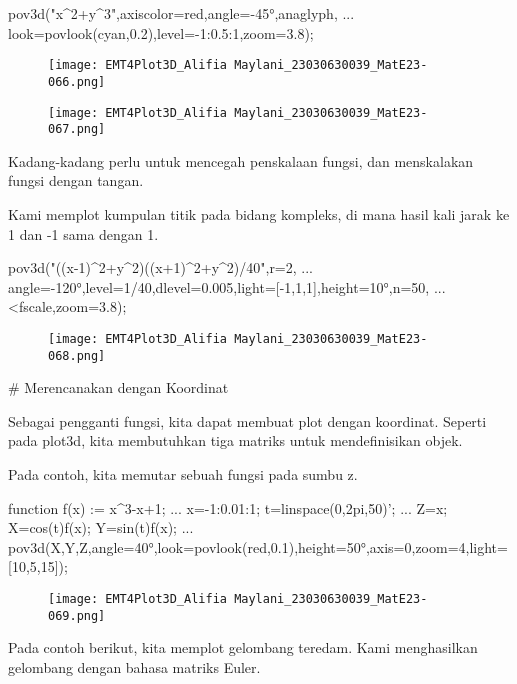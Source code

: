 \documentclass{article}
\begin{document}
\>pov3d("x^2+y^3",axiscolor=red,angle=-45°,\>anaglyph, ...  
\>     look=povlook(cyan,0.2),level=-1:0.5:1,zoom=3.8);




\begin{figure}
    \centering
    \texttt{[image: EMT4Plot3D\_Alifia Maylani\_23030630039\_MatE23-066.png]}
    \caption{}
    \label{fig:enter-label}
\end{figure}

\begin{figure}
    \centering
    \texttt{[image: EMT4Plot3D\_Alifia Maylani\_23030630039\_MatE23-067.png]}
    \caption{}
    \label{fig:enter-label}
\end{figure}

Kadang-kadang perlu untuk mencegah penskalaan fungsi, dan menskalakan
fungsi dengan tangan.


Kami memplot kumpulan titik pada bidang kompleks, di mana hasil kali
jarak ke 1 dan -1 sama dengan 1.


\>pov3d("((x-1)^2+y^2)\*((x+1)^2+y^2)/40",r=2, ...  
\>     angle=-120°,level=1/40,dlevel=0.005,light=[-1,1,1],height=10°,n=50, ...  
\>     <fscale,zoom=3.8);


\begin{figure}
    \centering
    \texttt{[image: EMT4Plot3D\_Alifia Maylani\_23030630039\_MatE23-068.png]}
    \caption{}
    \label{fig:enter-label}
\end{figure}

# Merencanakan dengan Koordinat

Sebagai pengganti fungsi, kita dapat membuat plot dengan koordinat.
Seperti pada plot3d, kita membutuhkan tiga matriks untuk
mendefinisikan objek.


Pada contoh, kita memutar sebuah fungsi pada sumbu z.


\>function f(x) := x^3-x+1; ...  
\>   x=-1:0.01:1; t=linspace(0,2pi,50)'; ...  
\>   Z=x; X=cos(t)\*f(x); Y=sin(t)\*f(x); ...  
\>   pov3d(X,Y,Z,angle=40°,look=povlook(red,0.1),height=50°,axis=0,zoom=4,light=[10,5,15]);


\begin{figure}
    \centering
    \texttt{[image: EMT4Plot3D\_Alifia Maylani\_23030630039\_MatE23-069.png]}
    \caption{}
    \label{fig:enter-label}
\end{figure}

Pada contoh berikut, kita memplot gelombang teredam. Kami menghasilkan
gelombang dengan bahasa matriks Euler.
\end{document}
